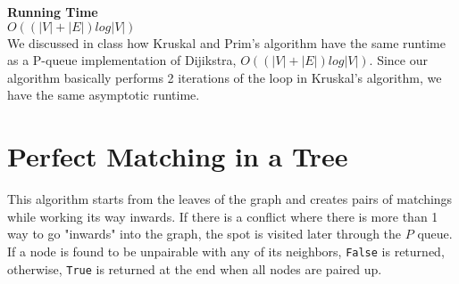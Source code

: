 \documentclass{article}
\begin{document}
\textbf{Running Time} \\
$O((|V| + |E|)log|V|)$ \\
We discussed in class how Kruskal and Prim's algorithm have the same runtime as a P-queue implementation of Dijikstra, $O((|V| + |E|)log|V|)$.
Since our algorithm basically performs 2 iterations of the loop in Kruskal's algorithm, we have the same asymptotic runtime.

\newpage
\section{Perfect Matching in a Tree}
\footnotesize
This algorithm starts from the leaves of the graph and creates pairs of matchings while working its way inwards.
If there is a conflict where there is more than 1 way to go "inwards" into the graph, the spot is visited later through the $P$ queue.
If a node is found to be unpairable with any of its neighbors, \texttt{False} is returned, otherwise, \texttt{True} is returned at the end
when all nodes are paired up.
\end{document}
